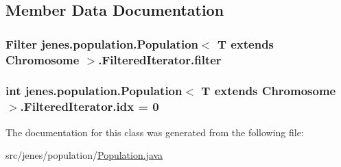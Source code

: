 \subsection{Member Data Documentation}
\hypertarget{classjenes_1_1population_1_1_population_3_01_t_01extends_01_chromosome_01_4_1_1_filtered_iterator_a620ba1ca9591ae9b3268066c4c3eadc7}{
\subsubsection[{filter}]{\setlength{\rightskip}{0pt plus 5cm}Filter jenes.\-population.\-Population$<$ T extends Chromosome $>$.Filtered\-Iterator.\-filter\hspace{0.3cm}{\ttfamily [private]}}}\label{classjenes_1_1population_1_1_population_3_01_t_01extends_01_chromosome_01_4_1_1_filtered_iterator_a620ba1ca9591ae9b3268066c4c3eadc7}
\hypertarget{classjenes_1_1population_1_1_population_3_01_t_01extends_01_chromosome_01_4_1_1_filtered_iterator_a3b9be4de9652c3b701a05793d11b418f}{
\subsubsection[{idx}]{\setlength{\rightskip}{0pt plus 5cm}int jenes.\-population.\-Population$<$ T extends Chromosome $>$.Filtered\-Iterator.\-idx = 0\hspace{0.3cm}{\ttfamily [private]}}}\label{classjenes_1_1population_1_1_population_3_01_t_01extends_01_chromosome_01_4_1_1_filtered_iterator_a3b9be4de9652c3b701a05793d11b418f}


The documentation for this class was generated from the following file\-:\begin{DoxyCompactItemize}
\item 
src/jenes/population/\hyperlink{_population_8java}{Population.\-java}\end{DoxyCompactItemize}
